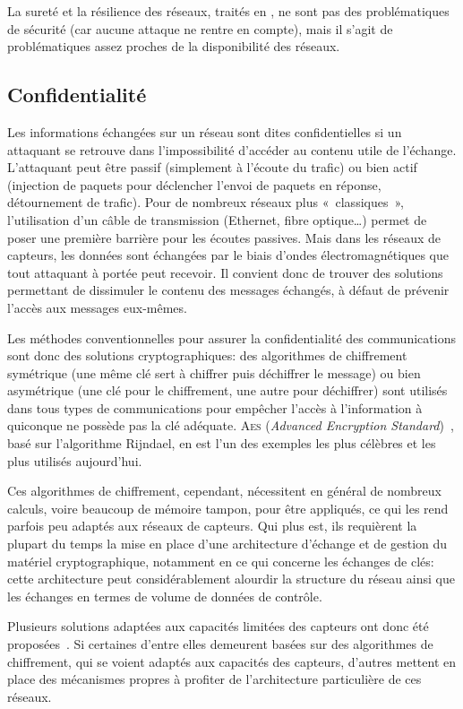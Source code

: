 La sureté et la résilience des réseaux, traités en , ne sont pas des problématiques de sécurité (car aucune attaque ne rentre en compte), mais il s'agit de problématiques assez proches de la disponibilité des réseaux.

\subsection{Confidentialité}

Les informations échangées sur un réseau sont dites confidentielles si un attaquant se retrouve dans l'impossibilité d'accéder au contenu utile de l'échange.
L'attaquant peut être passif (simplement à l'écoute du trafic) ou bien actif (injection de paquets pour déclencher l'envoi de paquets en réponse, détournement de trafic).
Pour de nombreux réseaux plus « classiques », l'utilisation d'un câble de transmission (Ethernet, fibre optique\dots) permet de poser une première barrière pour les écoutes passives.
Mais dans les réseaux de capteurs, les données sont échangées par le biais d'ondes électromagnétiques que tout attaquant à portée peut recevoir.
Il convient donc de trouver des solutions permettant de dissimuler le contenu des messages échangés, à défaut de prévenir l'accès aux messages eux-mêmes.

Les méthodes conventionnelles pour assurer la confidentialité des communications sont donc des solutions cryptographiques: des algorithmes de chiffrement symétrique (une même clé sert à chiffrer puis déchiffrer le message) ou bien asymétrique (une clé pour le chiffrement, une autre pour déchiffrer) sont utilisés dans tous types de communications pour empêcher l'accès à l'information à quiconque ne possède pas la clé adéquate.
\textsc{Aes} (\textit{Advanced Encryption Standard})~\cite{aes}, basé sur l'algorithme Rijndael, en est l'un des exemples les plus célèbres et les plus utilisés aujourd'hui.

Ces algorithmes de chiffrement, cependant, nécessitent en général de nombreux calculs, voire beaucoup de mémoire tampon, pour être appliqués, ce qui les rend parfois peu adaptés aux réseaux de capteurs.
Qui plus est, ils requièrent la plupart du temps la mise en place d'une architecture d'échange et de gestion du matériel cryptographique, notamment en ce qui concerne les échanges de clés: cette architecture peut considérablement alourdir la structure du réseau ainsi que les échanges en termes de volume de données de contrôle.

Plusieurs solutions adaptées aux capacités limitées des capteurs ont donc été proposées~\cite{OX09}.
Si certaines d'entre elles demeurent basées sur des algorithmes de chiffrement, qui se voient adaptés aux capacités des capteurs, d'autres mettent en place des mécanismes propres à profiter de l'architecture particulière de ces réseaux.




